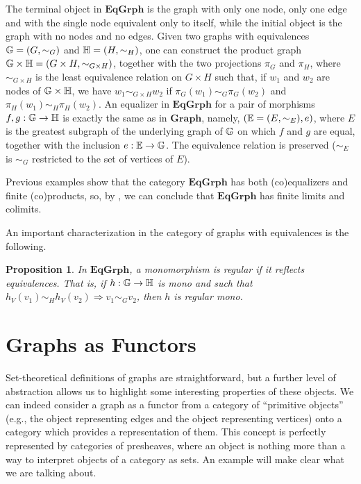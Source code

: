 \documentclass[a4paper, twoside,openright]{report}
\theoremstyle{plain}
\newtheorem{prop}[theorem]{Proposition}
\theoremstyle{definition}
\begin{document}
The terminal object in $\mathbf{EqGrph}$ is the graph with only one node, only one edge and with the single node equivalent only to itself, while the initial object is the graph with no nodes and no edges.
Given two graphs with equivalences $\mathbb{G} = (G, \sim_G) $ and $\mathbb{H} = (H, \sim_{H})$, one can construct the product graph $\mathbb{G \times H} = (G \times H, \sim_{G \times H})$, together with the two projections $\pi_G$ and $\pi_H$,  where $\sim_{G \times H}$ is the least equivalence relation on $G \times H$ such that, if $w_1$ and $w_2$ are nodes of $\mathbb{G \times H}$, we have $w_1 \sim_{G \times H} w_2$ if $\pi_G(w_1) \sim_G \pi_G(w_2)$ and $\pi_H(w_1) \sim_H \pi_H(w_2)$.
An equalizer in $\mathbf{EqGrph}$ for a pair of morphisms $f, g: \mathbb{G \rightarrow H}$ is exactly the same as in $\mathbf{Graph}$, namely, $(\mathbb{E} = (E, \sim_E), e)$, where $E$ is the greatest subgraph of the underlying graph of $\mathbb{G}$ on which $f$ and $g$ are equal, together with the inclusion $e: \mathbb{E \rightarrow G}$. The equivalence relation is preserved ($\sim_E$ is $\sim_G$ restricted to the set of vertices of $E$).

Previous examples show that the category $\mathbf{EqGrph}$ has both (co)equalizers and finite (co)products, so, by , we can conclude that $\mathbf{EqGrph}$ has finite limits and colimits.

An important characterization in the category of graphs with equivalences is the following. 

\begin{prop}\label{prop:reg_mono_in_EG_are_mono_in_graph}
    In $\mathbf{EqGrph}$, a monomorphism is regular if it reflects equivalences. That is, if $h: \mathbb{G \rightarrow H}$ is mono and such that $h_V (v_1) \sim_H h_V(v_2) \Rightarrow v_1 \sim_G v_2$, then $h$ is regular mono.
\end{prop}



\section{Graphs as Functors}


Set-theoretical definitions of graphs are straightforward, but a further level of abstraction allows us to highlight some interesting properties of these objects. We can indeed consider a graph as a functor from a category of ``primitive objects'' (e.g., the object representing edges and the object representing vertices) onto a category which provides a representation of them. This concept is perfectly represented by categories of presheaves, where an object is nothing more than a way to interpret objects of a category as sets. An example will make clear what we are talking about.
\end{document}
